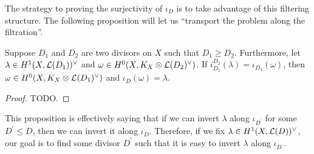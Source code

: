 The strategy to proving the surjectivity of $\iota_{D}$ is to take
advantage of this filtering structure. The following proposition will
let us ``transport the problem along the filtration''.
\begin{prop}\label{prop:invert_inclusion}
  Suppose $D_{1}$ and $D_{2}$ are two divisors on $X$ such that
  $D_{1}\geq D_{2}$. Furthermore, let $\lambda\in H^1(X,\mathcal{L}(D_{1}))^{\vee}$ and
  $\omega\in H^0(X,K_X\otimes\mathcal{L}(D_{2})^{\vee})$. If $i_{D_{1}}^{D_{2}}(\lambda)
  =\iota_{D_{2}}(\omega)$, then $\omega\in H^0(X,K_X\otimes\mathcal{L}(D_{1})^{\vee})$ and
  $\iota_{D}(\omega)=\lambda$.
\end{prop}
\begin{proof}
  TODO.
\end{proof}
This proposition is effectively saying that if we can invert $\lambda$
along $\iota_{D^{\prime}}$ for some $D^{\prime}\leq D$, then we can
invert it along $\iota_{D}$. Therefore, if we fix $\lambda\in H^1(X,\mathcal{L}(D))^{\vee}$,
our goal is to find some divisor $D^{\prime}$ such that it is easy
to invert $\lambda$ along $\iota_{D^{\prime}}$.

